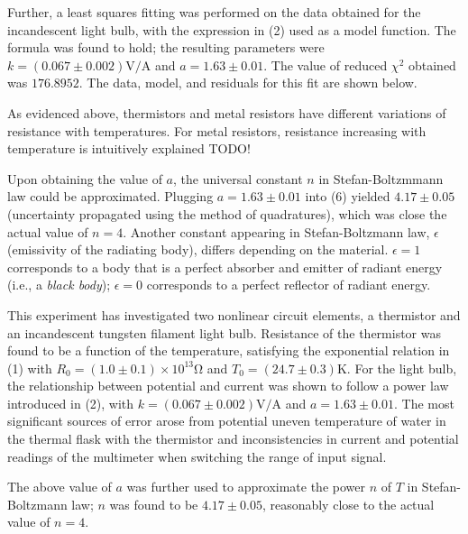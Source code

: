 \begin{paper}
	Further, a least squares fitting was performed on the data obtained for the incandescent light bulb, with the expression in (2) used as a model function. The formula was found to hold; the resulting parameters were \( k =  (0.067 \pm 0.002) \si{\volt\per\ampere} \) and \( a = 1.63 \pm 0.01 \). The value of reduced \( \chi ^ 2 \) obtained was \( 176.8952 \). The data, model, and residuals for this fit are shown below.

	 \vspace{1em}
	
	As evidenced above, thermistors and metal resistors have different variations of resistance with temperatures. For metal resistors, resistance increasing with temperature is intuitively explained TODO!
	
	Upon obtaining the value of \( a \), the universal constant \( n \) in Stefan-Boltzmmann law could be approximated. Plugging \( a = 1.63 \pm 0.01 \) into (6) yielded \( 4.17 \pm 0.05 \) (uncertainty propagated using the method  of quadratures), which was close the actual value of \( n = 4\). Another constant appearing in Stefan-Boltzmann law, \( \epsilon \) (emissivity of the radiating body), differs depending on the material. \( \epsilon = 1 \) corresponds to a body that is a perfect absorber and emitter of radiant energy (i.e., a \textit{black body}); \( \epsilon = 0 \) corresponds to a perfect reflector of radiant energy. 
	

		This experiment has investigated two nonlinear circuit elements, a thermistor and an incandescent tungsten filament light bulb. Resistance of the thermistor was found to be a function of the temperature, satisfying the exponential relation in (1) with \( R_0 = (1.0 \pm 0.1) \times 10^{13} \si{\ohm} \) and \( T_0 = (24.7 \pm 0.3) \si{\kelvin} \).  For the light bulb, the relationship between potential and current was shown to follow a power law introduced in (2), with \( k =  (0.067 \pm 0.002) \si{\volt\per\ampere} \) and \( a = 1.63 \pm 0.01 \). The most significant sources of error arose from potential uneven temperature of water in the thermal flask with the thermistor and inconsistencies in current and potential readings of the multimeter when switching the range of input signal. 
		
		The above value of \( a \) was further used to approximate the power \( n \) of \( T \) in Stefan-Boltzmann law; \( n \) was found to be \( 4.17 \pm 0.05 \), reasonably close to the actual value of \( n = 4 \). 



\papersource{}

\end{paper}

